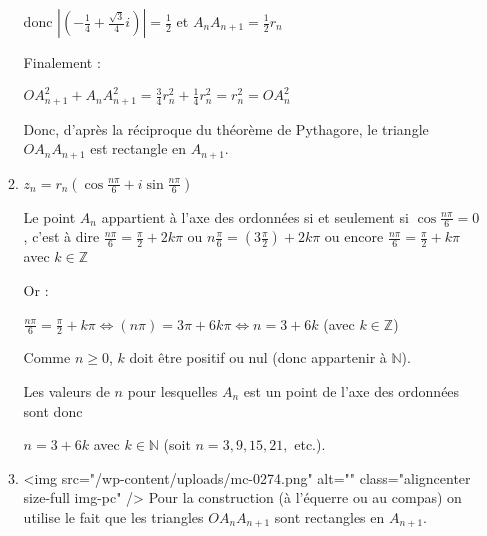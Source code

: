 \begin{corrige}
\begin{enumerate}
\begin{enumerate}
               donc $\left| \left(-\frac{1}{4} + \frac{\sqrt{3}}{4}i\right) \right| = \frac{1}{2}$ et $A_{n}A_{n+1}=\frac{1}{2}r_{n}$
               \par
               Finalement :
               \par
               $ OA_{n+1}^{2} + A_{n}A_{n+1}^{2} = \frac{3}{4}r_{n}^{2}+\frac{1}{4}r_{n}^{2} = r_{n}^{2} = OA_{n}^{2}$
               \par
               Donc, d'après la réciproque du théorème de Pythagore, le triangle $OA_{n}A_{n+1}$ est rectangle en $A_{n+1}$.
               \item
               $z_{n}=r_{n} \left(\cos\frac{n\pi }{6}+i \sin\frac{n\pi }{6}\right)$
               \par
               Le point $A_{n}$ appartient à l'axe des ordonnées si et seulement si $\cos\frac{n\pi }{6} = 0$, c'est à dire $\frac{n\pi }{6}=\frac{\pi }{2}+2k\pi $ ou $n\frac{\pi }{6}=\left(3\frac{\pi }{2}\right)+2k\pi $ ou encore $\frac{n\pi }{6}=\frac{\pi }{2} + k\pi $ avec $k \in  \mathbb{Z}$
               \par
               Or :
               \par
               $\frac{n\pi }{6}=\frac{\pi }{2} + k\pi   \Leftrightarrow  \left(n\pi \right)=3\pi  + 6k\pi    \Leftrightarrow  n= 3 + 6k$  (avec $k \in  \mathbb{Z}$)
               \par
               Comme $n\geqslant 0$, $k$ doit être positif ou nul (donc appartenir à $\mathbb{N}$).
               \par
               Les valeurs de $n$  pour lesquelles $A_{n}$ est un point de l'axe des ordonnées sont donc
               \par
               $n= 3 + 6k$  avec $k \in  \mathbb{N}$ (soit $n = 3, 9, 15, 21,$ etc.).
               \item
               <img src="/wp-content/uploads/mc-0274.png" alt="" class="aligncenter size-full  img-pc" />
               Pour la construction (à l'équerre ou au compas) on utilise le fait que les triangles $OA_{n}A_{n+1}$ sont rectangles en $A_{n+1}$.
          \end{enumerate}
     \end{enumerate}
\end{corrige}
